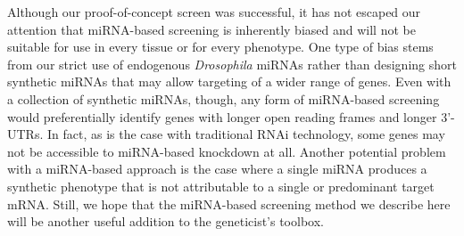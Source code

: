 Although our proof-of-concept screen was successful, it has not escaped our attention that miRNA-based screening is inherently biased and will not be suitable for use in every tissue or for every phenotype.
One type of bias stems from our strict use of endogenous \emph{Drosophila} miRNAs rather than designing short synthetic miRNAs that may allow targeting of a wider range of genes.
Even with a collection of synthetic miRNAs, though, any form of miRNA-based screening would preferentially identify genes with longer open reading frames and longer 3'-UTRs.
In fact, as is the case with traditional RNAi technology, some genes may not be accessible to miRNA-based knockdown at all.
Another potential problem with a miRNA-based approach is the case where a single miRNA produces a synthetic phenotype that is not attributable to a single or predominant target mRNA.
Still, we hope that the miRNA-based screening method we describe here will be another useful addition to the geneticist's toolbox.
